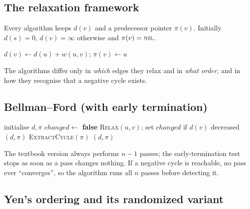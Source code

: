 \documentclass[11pt,a4paper]{article}
\theoremstyle{definition}
\newcommand{\dd}{\mathit{d}}
\newcommand{\pred}{\pi}
\begin{document}
\subsection{The relaxation framework}

Every algorithm keeps $\dd(v)$ and a predecessor pointer $\pred(v)$. Initially $\dd(s)=0$, $\dd(v)=\infty$ otherwise and $\pred(v)=\textsc{nil}$.

\begin{algorithm}[h]
\caption{\textsc{Relax}$(u,v)$}
\begin{algorithmic}[1]
\If{$\dd(u)+w(u,v) < \dd(v)$}
  \State $\dd(v)\gets \dd(u)+w(u,v)$; \quad $\pred(v)\gets u$
\EndIf
\end{algorithmic}
\end{algorithm}

The algorithms differ only in \emph{which} edges they relax and in \emph{what order}, and in how they recognise that a negative cycle exists.

\subsection{Bellman--Ford (with early termination)}

\begin{algorithm}[h]
\caption{\textsc{Bellman-Ford}$(G,w,s)$}
\label{alg:bf}
\begin{algorithmic}[1]
\State initialise $\dd,\pred$
  \State $\mathit{changed}\gets$ \textbf{false}
   \State \textsc{Relax}$(u,v)$; set $\mathit{changed}$ if $\dd(v)$ decreased \EndFor
   \Return $(\dd,\pred)$ \EndIf
\EndFor
{}
  \If{$\dd(u)+w(u,v)<\dd(v)$} \Return \textsc{ExtractCycle}$(\pred)$ \EndIf
\EndFor
\State \Return $(\dd,\pred)$
\end{algorithmic}
\end{algorithm}

The textbook version always performs $n-1$ passes; the early-termination test stops as soon as a pass changes nothing. If a negative cycle is reachable, no pass ever ``converges'', so the algorithm runs all $n$ passes before detecting it.

\subsection{Yen's ordering and its randomized variant}
\end{document}
